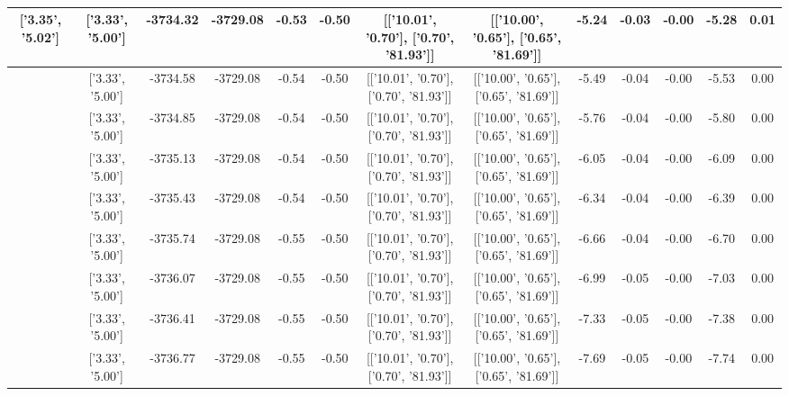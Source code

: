 \begin{table}[htbp]
\begin{adjustbox}{angle=90}
\begin{tabular}{|c|c|c|c|c|c|c|c|c|c|c|c|c|}
 ['3.35', '5.02'] & ['3.33', '5.00'] & -3734.32 & -3729.08 & -0.53 & -0.50 & [['10.01', '0.70'], ['0.70', '81.93']] & [['10.00', '0.65'], ['0.65', '81.69']] & -5.24 & -0.03 & -0.00 & -5.28 & 0.01\\ \hline
 ['3.35', '5.02'] & ['3.33', '5.00'] & -3734.58 & -3729.08 & -0.54 & -0.50 & [['10.01', '0.70'], ['0.70', '81.93']] & [['10.00', '0.65'], ['0.65', '81.69']] & -5.49 & -0.04 & -0.00 & -5.53 & 0.00\\ \hline
 ['3.35', '5.02'] & ['3.33', '5.00'] & -3734.85 & -3729.08 & -0.54 & -0.50 & [['10.01', '0.70'], ['0.70', '81.93']] & [['10.00', '0.65'], ['0.65', '81.69']] & -5.76 & -0.04 & -0.00 & -5.80 & 0.00\\ \hline
 ['3.35', '5.02'] & ['3.33', '5.00'] & -3735.13 & -3729.08 & -0.54 & -0.50 & [['10.01', '0.70'], ['0.70', '81.93']] & [['10.00', '0.65'], ['0.65', '81.69']] & -6.05 & -0.04 & -0.00 & -6.09 & 0.00\\ \hline
 ['3.35', '5.02'] & ['3.33', '5.00'] & -3735.43 & -3729.08 & -0.54 & -0.50 & [['10.01', '0.70'], ['0.70', '81.93']] & [['10.00', '0.65'], ['0.65', '81.69']] & -6.34 & -0.04 & -0.00 & -6.39 & 0.00\\ \hline
 ['3.36', '5.02'] & ['3.33', '5.00'] & -3735.74 & -3729.08 & -0.55 & -0.50 & [['10.01', '0.70'], ['0.70', '81.93']] & [['10.00', '0.65'], ['0.65', '81.69']] & -6.66 & -0.04 & -0.00 & -6.70 & 0.00\\ \hline
 ['3.36', '5.02'] & ['3.33', '5.00'] & -3736.07 & -3729.08 & -0.55 & -0.50 & [['10.01', '0.70'], ['0.70', '81.93']] & [['10.00', '0.65'], ['0.65', '81.69']] & -6.99 & -0.05 & -0.00 & -7.03 & 0.00\\ \hline
 ['3.36', '5.02'] & ['3.33', '5.00'] & -3736.41 & -3729.08 & -0.55 & -0.50 & [['10.01', '0.70'], ['0.70', '81.93']] & [['10.00', '0.65'], ['0.65', '81.69']] & -7.33 & -0.05 & -0.00 & -7.38 & 0.00\\ \hline
 ['3.36', '5.02'] & ['3.33', '5.00'] & -3736.77 & -3729.08 & -0.55 & -0.50 & [['10.01', '0.70'], ['0.70', '81.93']] & [['10.00', '0.65'], ['0.65', '81.69']] & -7.69 & -0.05 & -0.00 & -7.74 & 0.00\\ \hline
            \end{tabular}
        \end{adjustbox}
        \caption{}
        \label{}
    \end{table}
    